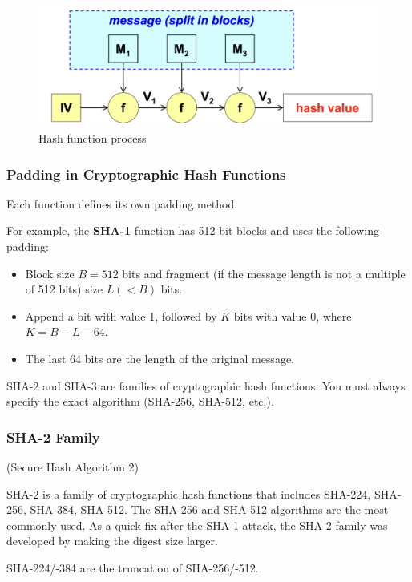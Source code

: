 \begin{figure}[H]
    \centering
    \includegraphics[width=0.5\linewidth]{Images/Cryptography/hash_f.png}
    \caption{Hash function process}
\end{figure}

\subsubsection*{Padding in Cryptographic Hash Functions}
Each function defines its own padding method.

For example, the \textbf{SHA-1} function has 512-bit blocks and uses the following padding:
\begin{itemize}
    \item Block size $B = 512$ bits and fragment (if the message length is not a multiple of 512 bits) size $L (< B)$ bits.
    \item Append a bit with value 1, followed by $K$ bits with value 0, where $K = B - L - 64$.
    \item The last 64 bits are the length of the original message.
\end{itemize}


\begin{tcolorbox}[colback=red!10!white, colframe=red!70!black, coltitle=white, title=Beware]
SHA-2 and SHA-3 are families of cryptographic hash functions. You must always specify the exact algorithm (SHA-256, SHA-512, etc.).
\end{tcolorbox}

\subsubsection*{SHA-2 Family}
\begin{center}
    (Secure Hash Algorithm 2)
\end{center}
SHA-2 is a family of cryptographic hash functions that includes SHA-224, SHA-256, SHA-384, SHA-512. The SHA-256 and SHA-512 algorithms are the most commonly used. As a quick fix after the SHA-1 attack, the SHA-2 family was developed by making the digest size larger.

SHA-224/-384 are the truncation of SHA-256/-512. 

